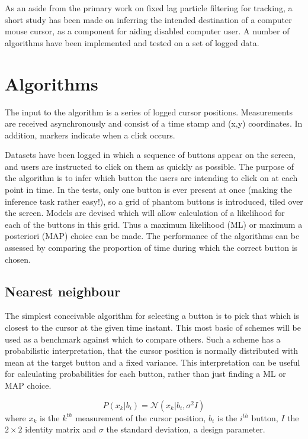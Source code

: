 As an aside from the primary work on fixed lag particle filtering for tracking, a short study has been made on inferring the intended destination of a computer mouse cursor, as a component for aiding disabled computer user. A number of algorithms have been implemented and tested on a set of logged data.



\section{Algorithms}
The input to the algorithm is a series of logged cursor positions. Measurements are received asynchronously and consist of a time stamp and (x,y) coordinates. In addition, markers indicate when a click occurs.

Datasets have been logged in which a sequence of buttons appear on the screen, and users are instructed to click on them as quickly as possible. The purpose of the algorithm is to infer which button the users are intending to click on at each point in time. In the tests, only one button is ever present at once (making the inference task rather easy!), so a grid of phantom buttons is introduced, tiled over the screen. Models are devised which will allow calculation of a likelihood for each of the buttons in this grid. Thus a maximum likelihood (ML) or maximum a posteriori (MAP) choice can be made. The performance of the algorithms can be assessed by comparing the proportion of time during which the correct button is chosen.



\subsection{Nearest neighbour}
The simplest conceivable algorithm for selecting a button is to pick that which is closest to the cursor at the given time instant. This most basic of schemes will be used as a benchmark against which to compare others. Such a scheme has a probabilistic interpretation, that the cursor position is normally distributed with mean at the target button and a fixed variance. This interpretation can be useful for calculating probabilities for each button, rather than just finding a ML or MAP choice.

\begin{equation}P(x_k|b_i) = \mathcal{N}(x_k|b_i, \sigma^2 I)\end{equation}
where $x_k$ is the $k^{th}$ measurement of the cursor position, $b_i$ is the $i^{th}$ button, $I$ the $2 \times 2$ identity matrix and $\sigma$ the standard deviation, a design parameter.

